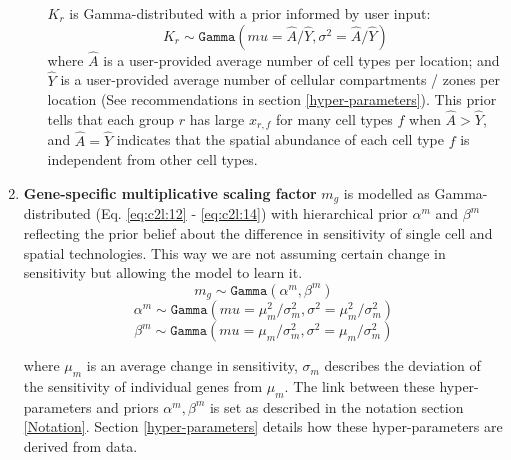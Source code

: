 \documentclass[11pt,a4paper]{article}
\begin{document}
\begin{enumerate}
\begin{itemize}
        $K_r$ is Gamma-distributed with a prior informed by user input:
        \begin{equation} \label{eq:c2l:11}
        K_r \sim \mathtt{Gamma}(mu =  \hat{A} / \hat{Y}, \sigma^2 = \hat{A} / \hat{Y})
        \end{equation}
        where $\hat{A}$ is a user-provided average number of cell types per location; and $\hat{Y}$ is a user-provided average number of cellular compartments / zones per location (See recommendations in section \ref{hyper-parameters}). This prior tells that each group $r$ has large $x_{r,f}$ for many cell types $f$ when $\hat{A} > \hat{Y}$, and $\hat{A} = \hat{Y}$ indicates that the spatial abundance of each cell type $f$ is independent from other cell types. 
    
        \end{itemize}
    
    \item \textbf{Gene-specific multiplicative scaling factor} $m_{g}$ is modelled as Gamma-distributed (Eq. \eqref{eq:c2l:12} - \eqref{eq:c2l:14}) with hierarchical prior $\alpha^m$ and $\beta^m$ reflecting the prior belief about the difference in sensitivity of single cell and spatial technologies. This way we are not assuming certain change in sensitivity but allowing the model to learn it.
    \begin{equation} \label{eq:c2l:12}
    m_{g} \sim \mathtt{Gamma}(\alpha^m, \beta^m) 
    \end{equation}
    \begin{equation} \label{eq:c2l:13}
    \alpha^m \sim \mathtt{Gamma}(mu = \mu_m ^ 2 / \sigma_m ^ 2, \sigma^2 = \mu_m ^ 2 / \sigma_m ^ 2)
    \end{equation}
    \begin{equation} \label{eq:c2l:14}
    \beta^m \sim \mathtt{Gamma}(mu = \mu_m / \sigma_m ^ 2, \sigma^2 =\mu_m / \sigma_m ^ 2)
    \end{equation}
    
    where $\mu_m$ is an average change in sensitivity, $\sigma_m$ describes the deviation of the sensitivity of individual genes from $\mu_m$. The link between these hyper-parameters and priors $\alpha^m, \beta^m$ is set as described in the notation section \ref{Notation}. Section \ref{hyper-parameters} details how these hyper-parameters are derived from data.
    

\end{enumerate}
\end{document}
